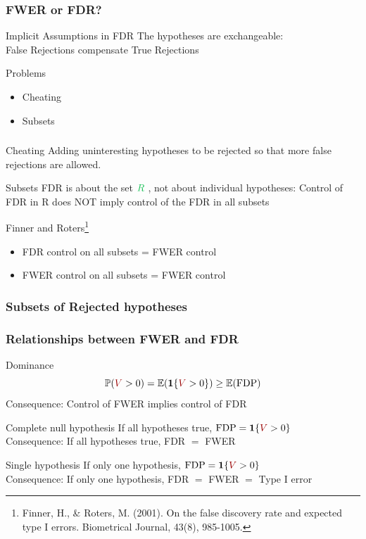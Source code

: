 \documentclass[xcolor={dvipsnames}]{beamer}
\newcommand{\rbf}[1]{\textcolor{redUnipd}{ #1}}
\newcommand{\bb}[1]{\begin{block}{#1}}
\newcommand{\eb}{\end{block}}
\newcommand{\bi}{\begin {itemize}}
\newcommand{\ei}{\end{itemize}}
\newcommand{\bfr}[1]{\begin{frame} \frametitle{#1}}
\begin{document}
\bfr{FWER or FDR?}
  \bb{Implicit Assumptions in FDR}
    The hypotheses are exchangeable:
    \\ False Rejections compensate True Rejections
  \eb
  \pause
  \bb{Problems}
    \bi
     \item Cheating 
     \item Subsets
    \ei
  \eb
\end{frame}

\bfr{}
\bb{Cheating}
Adding uninteresting hypotheses to be rejected so that more false rejections are allowed.
\eb
\pause
\bb{Subsets}
FDR is about the set ${\color[HTML]{16c155} R}$ , not about individual hypotheses:
Control of FDR in R does NOT imply control of the FDR in all subsets\\
\eb
Finner and Roters\footnote{Finner, H., \& Roters, M. (2001). On the false discovery rate and expected type I errors. Biometrical Journal, 43(8), 985-1005.}
    \bi
      \item FDR control on all subsets = FWER control
      \item FWER control on all subsets = FWER control
    \ei

\end{frame}

\bfr{Subsets of Rejected hypotheses}
\end{frame}




\bfr{Relationships between FWER and FDR}
  \bb{Dominance}
    \[ \mathbb{P}({\color[HTML]{9A0000} V} > 0) = \mathbb{E}(\boldsymbol{1}\{{\color[HTML]{9A0000} V}> 0\}) \geq \mathbb{E}(\mathrm{FDP}) \]
    Consequence: Control of FWER implies control of FDR
  \eb
  \bb{Complete null hypothesis}
    If all hypotheses true, $\mathrm{FDP} = \boldsymbol{1}\{{\color[HTML]{9A0000} V}  > 0\}$
    \\ Consequence: If all hypotheses true, FDR $=$ FWER
  \eb
  \bb{Single hypothesis}
    If only one hypothesis, $\mathrm{FDP} = \boldsymbol{1}\{{\color[HTML]{9A0000} V}  > 0\}$
    \\ Consequence: If only one hypothesis, FDR $=$ FWER $=$ \rbf{Type I error}
  \eb
\end{frame}
\end{document}

